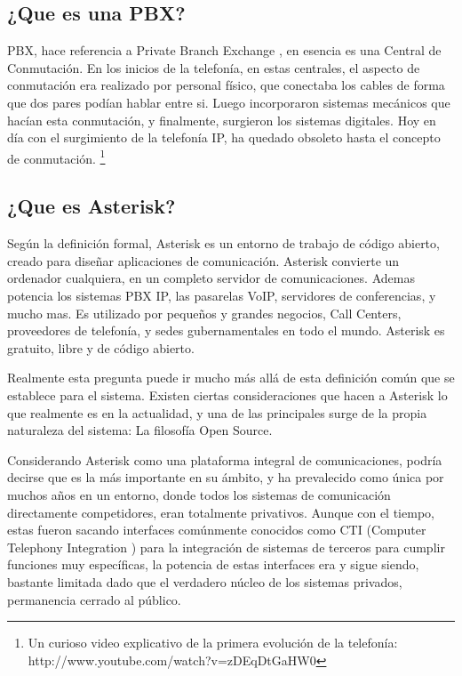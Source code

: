 \subsection{¿Que es una PBX?}

PBX, hace referencia a Private Branch Exchange \cite{website:pbx}, en esencia es una Central de Conmutación. En los inicios de la telefonía, en estas centrales, el aspecto de conmutación era realizado por personal físico, que conectaba los cables de forma que dos pares podían hablar entre si. Luego incorporaron sistemas mecánicos que hacían esta conmutación, y finalmente, surgieron los sistemas digitales. Hoy en día con el surgimiento de la telefonía IP, ha quedado obsoleto hasta el concepto de conmutación. \footnote{Un curioso video explicativo de la primera evolución de la telefonía: http://www.youtube.com/watch?v=zDEqDtGaHW0}

\subsection{¿Que es Asterisk?}

Según la definición formal, Asterisk es un entorno de trabajo de código abierto, creado para diseñar aplicaciones de comunicación. Asterisk convierte un ordenador cualquiera, en un completo servidor de comunicaciones. Ademas potencia los sistemas PBX IP, las pasarelas VoIP, servidores de conferencias, y mucho mas. Es utilizado por pequeños y grandes negocios, Call Centers, proveedores de telefonía, y sedes gubernamentales en todo el mundo. Asterisk es gratuito, libre y de código abierto.

Realmente esta pregunta puede ir mucho más allá de esta definición común que se establece para el sistema. Existen ciertas consideraciones que hacen a Asterisk lo que realmente es en la actualidad, y una de las principales surge de la propia naturaleza del sistema: La filosofía Open Source.

Considerando Asterisk como una plataforma integral de comunicaciones, podría decirse que es la más importante en su ámbito, y ha prevalecido como única por muchos años en un entorno, donde todos los sistemas de comunicación directamente competidores, eran totalmente privativos. Aunque con el tiempo, estas fueron sacando interfaces comúnmente conocidos como CTI (Computer Telephony Integration \cite{website:cti}) para la integración de sistemas de terceros para cumplir funciones muy específicas, la potencia de estas interfaces era y sigue siendo, bastante limitada dado que el verdadero núcleo de los sistemas privados, permanencia cerrado al público.

